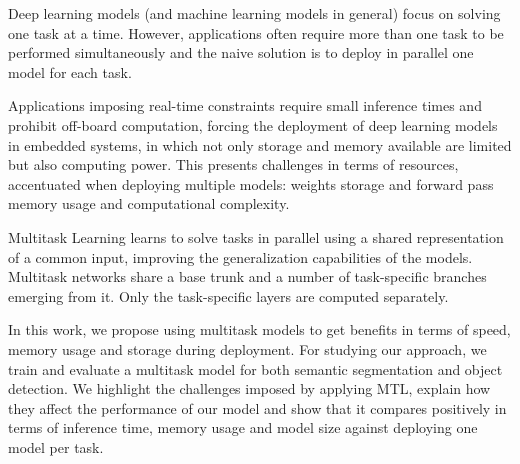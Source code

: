 Deep learning models (and machine learning models in general) focus on solving one task at a time. However, applications often require more than one task to be performed simultaneously and the naive solution is to deploy in parallel one model for each task.

Applications imposing real-time constraints require small inference times and prohibit off-board computation, forcing the deployment of deep learning models in embedded systems, in which not only storage and memory available are limited but also computing power. This presents challenges in terms of resources, accentuated when deploying multiple models: weights storage and forward pass memory usage and computational complexity.

Multitask Learning \cite{Caruana} learns to solve tasks in parallel using a shared representation of a common input, improving the generalization capabilities of the models. Multitask networks share a base trunk and a number of task-specific branches emerging from it. Only the task-specific layers are computed separately.

In this work, we propose using multitask models to get benefits in terms of speed, memory usage and storage during deployment. For studying our approach, we train and evaluate a multitask model for both semantic segmentation and object detection. We highlight the challenges imposed by applying MTL, explain how they affect the performance of our model and show that it compares positively in terms of inference time, memory usage and model size against deploying one model per task.

